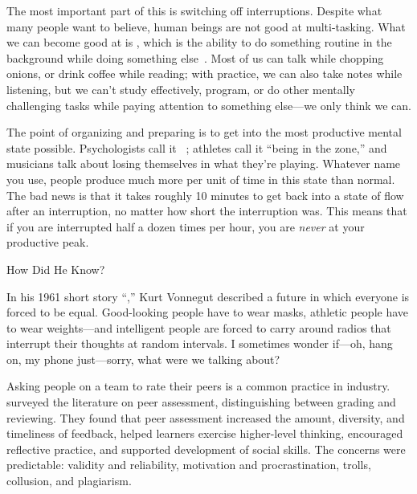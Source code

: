 The most important part of this is switching off interruptions.
Despite what many people want to believe,
human beings are not good at multi-tasking.
What we can become good at is ,
which is the ability to do something routine in the background
while doing something else~\cite{Mill2016a}.
Most of us can talk while chopping onions,
or drink coffee while reading;
with practice,
we can also take notes while listening,
but we can't study effectively,
program,
or do other mentally challenging tasks while paying attention to something else---we
only think we can.

The point of organizing and preparing is
to get into the most productive mental state possible.
Psychologists call it ~\cite{Csik2008};
athletes call it ``being in the zone,''
and musicians talk about losing themselves in what they're playing.
Whatever name you use,
people produce much more per unit of time in this state than normal.
The bad news is that
it takes roughly 10 minutes to get back into a state of flow after an interruption,
no matter how short the interruption was.
This means that if you are interrupted half a dozen times per hour,
you are \emph{never} at your productive peak.

\newpage

\begin{aside}{How Did He Know?}

  In his 1961 short story ``,''
  Kurt Vonnegut described a future in which everyone is forced to be equal.
  Good-looking people have to wear masks,
  athletic people have to wear weights---and intelligent people
  are forced to carry around radios that interrupt their thoughts at random intervals.
  I sometimes wonder if---oh, hang on, my phone just---sorry, what were we talking about?

\end{aside}


Asking people on a team to rate their peers is a common practice in industry.
\cite{Sond2012} surveyed the literature on peer assessment,
distinguishing between grading and reviewing.
They found that peer assessment increased the amount, diversity, and timeliness of feedback,
helped learners exercise higher-level thinking,
encouraged reflective practice,
and supported development of social skills.
The concerns were predictable:
validity and reliability,
motivation and procrastination,
trolls, collusion, and plagiarism.

